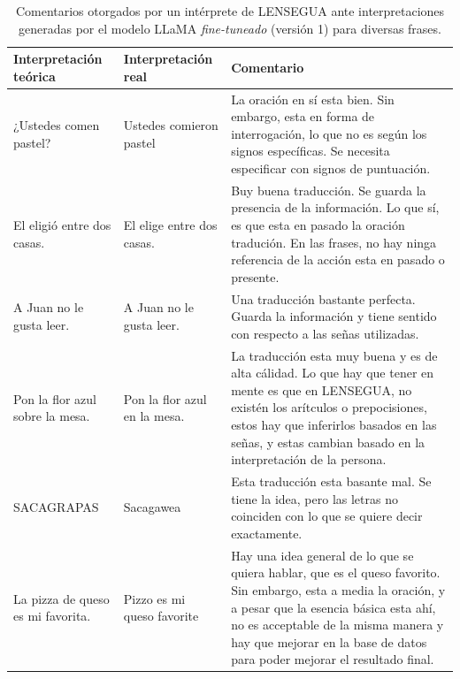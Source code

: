 \vspace{0.5cm}
\begin{table}[H]
\centering
    \begin{tabular}{|p{4cm}|p{4cm}|p{4cm}|}
        \hline
        \textbf{Interpretación teórica} & \textbf{Interpretación real} & \textbf{Comentario} \\
        \hline
        ¿Ustedes comen pastel? & Ustedes comieron pastel & La oración en sí esta bien. Sin embargo, esta en forma de interrogación, lo que no es según los signos específicas. Se necesita especificar con signos de puntuación.\\
        \hline
        El eligió entre dos casas. & El elige entre dos casas. &  Buy buena traducción. Se guarda la presencia de la información. Lo que sí, es que esta en pasado la oración tradución. En las frases, no hay ninga referencia de la acción esta en pasado o presente.\\
        \hline
        A Juan no le gusta leer. & A Juan no le gusta leer. & Una traducción bastante perfecta. Guarda la información y tiene sentido con respecto a las señas utilizadas.\\
        \hline
        Pon la flor azul sobre la mesa. & Pon la flor azul en la mesa. & La traducción esta muy buena y es de alta cálidad. Lo que hay que tener en mente es que en LENSEGUA, no existén los arítculos o prepocisiones, estos hay que inferirlos basados en las señas, y estas cambian basado en la interpretación de la persona. \\  
        \hline
        SACAGRAPAS & Sacagawea & Esta traducción esta basante mal. Se tiene la idea, pero las letras no coinciden con lo que se quiere decir exactamente. \\  
                \hline
        La pizza de queso es mi favorita. & Pizzo es mi queso favorite & Hay una idea general de lo que se quiera hablar, que es el queso favorito. Sin embargo, esta a media la oración, y a pesar que la esencia básica esta ahí, no es acceptable de la misma manera y hay que mejorar en la base de datos para poder mejorar el resultado final. \\  
        \hline
    \end{tabular}
    \caption{Comentarios otorgados por un intérprete de LENSEGUA ante interpretaciones generadas por el modelo LLaMA \textit{fine-tuneado} (versión 1) para diversas frases.}
\label{tab:LAMMA-Entr}
\end{table}
\vspace{0.5cm}

